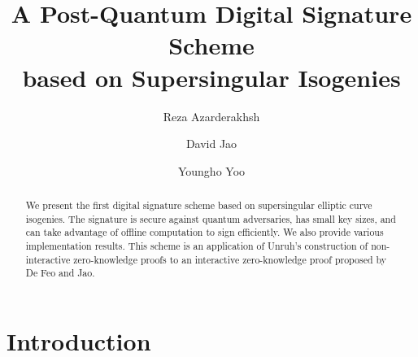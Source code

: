 \documentclass[runningheads,a4paper]{llncs}
\begin{document}
\mainmatter  %

\title{A Post-Quantum Digital Signature Scheme \\ based on Supersingular Isogenies}


%
%
\author{Reza Azarderakhsh \and David Jao \and Youngho Yoo}
%


%
%

\maketitle


\begin{abstract}
We present the first digital signature scheme based on supersingular elliptic curve isogenies. The signature is secure against quantum adversaries, has small key sizes, and can take advantage of offline computation to sign efficiently. We also provide various implementation results. This scheme is an application of Unruh's construction of non-interactive zero-knowledge proofs to an interactive zero-knowledge proof proposed by De Feo and Jao.
\end{abstract}



\section{Introduction}
\end{document}
